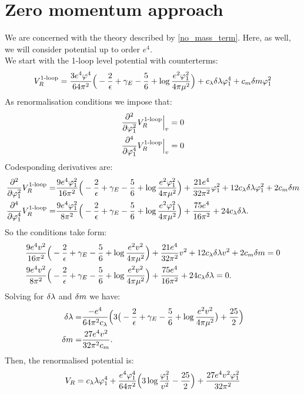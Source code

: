 \section{Zero momentum approach}
We are concerned with the theory described by \ref{no_mass_term}.
Here, as well, we will consider potential up to order $e^4$. \\
We start with the 1-loop level potential with counterterms:
\begin{align}
V_R^{\textrm{1-loop}} = \frac{3e^4\varphi^4}{64\pi^2}\Big(-\frac{2}{\epsilon}+\gamma_E-\frac{5}{6}+
\log{\frac{e^2\varphi_1^2}{4\pi\mu^2}}\Big) + c_\lambda\delta\lambda\varphi_1^4+c_m\delta m\varphi_1^2
\end{align}
As renormalisation conditions we impose that:
\begin{align}
\frac{\partial^2 }{\partial \varphi_1^2}V_R^{\textrm{1-loop}}\Big|_{v} &= 0 \\
\frac{\partial^4 }{\partial \varphi_1^4}V_R^{\textrm{1-loop}}\Big|_{v} &= 0
\end{align}
Codesponding derivatives are:
\begin{align}
\frac{\partial^2 }{\partial \varphi_1^2}V_R^{\textrm{1-loop}} = &\frac{9e^4\varphi_1^2}{16\pi^2}\Big(-\frac{2}{\epsilon}+\gamma_E-
\frac{5}{6}+\log{\frac{e^2\varphi_1^2}{4\pi\mu^2}}\Big)+\frac{21e^4}{32\pi^2}\varphi_1^2+ 
12c_\lambda\delta\lambda\varphi_1^2+2c_m\delta m \\
\frac{\partial^4 }{\partial \varphi_1^4}V_R^{\textrm{1-loop}} = &\frac{9e^4\varphi_1^2}{8\pi^2}\Big(-\frac{2}{\epsilon}+\gamma_E-
\frac{5}{6}+\log{\frac{e^2\varphi_1^2}{4\pi\mu^2}}\Big)+\frac{75e^4}{16\pi^2}+24c_\lambda\delta\lambda.
\end{align}
So the conditions take form:
\begin{align}
&\frac{9e^4v^2}{16\pi^2}\Big(-\frac{2}{\epsilon}+\gamma_E-
\frac{5}{6}+\log{\frac{e^2v^2}{4\pi\mu^2}}\Big)+\frac{21e^4}{32\pi^2}v^2+ 
12c_\lambda\delta\lambda v^2+2c_m\delta m = 0\\
&\frac{9e^4v^2}{8\pi^2}\Big(-\frac{2}{\epsilon}+\gamma_E-
\frac{5}{6}+\log{\frac{e^2v^2}{4\pi\mu^2}}\Big)+\frac{75e^4}{16\pi^2}+24c_\lambda\delta\lambda = 0.
\end{align}
Solving for $\delta\lambda$ and $\delta m$ we have:
\begin{align}
\delta\lambda = &\frac{-e^4}{64\pi^2c_\lambda}\Big(3\big(-\frac{2}{\epsilon}+\gamma_E-
\frac{5}{6}+\log\frac{e^2v^2}{4\pi\mu^2}\big)+\frac{25}{2}\Big) \\
\delta m = &\frac{27e^4v^2}{32\pi^2c_m}.
\end{align}
Then, the renormalised potential is:
\begin{align}
V_R = c_\lambda\lambda\varphi_1^4 + \frac{e^4\varphi_1^4}{64\pi^2}\Big(3\log\frac{\varphi_1^2}{v^2}- 
\frac{25}{2}\Big)+
\frac{27e^4v^2\varphi_1^2}{32\pi^2}
\end{align}

